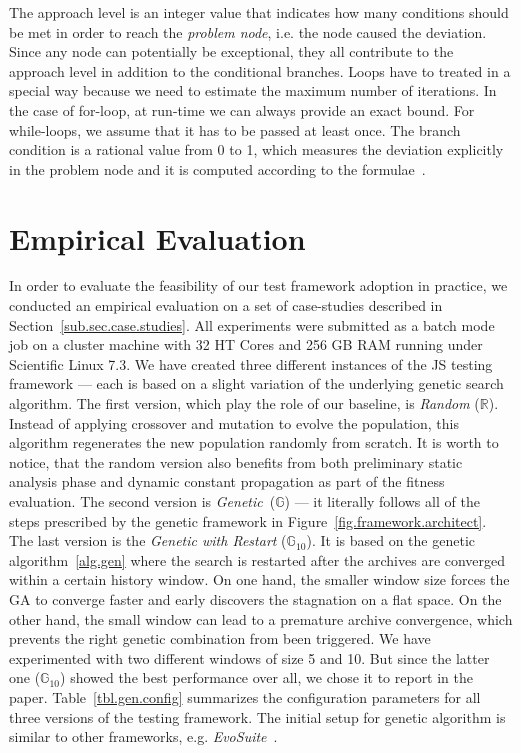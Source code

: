 \documentclass[sigconf,review,anonymous]{acmart}
\newcommand{\Random}{\mathbb{R}}
\newcommand{\Genetic}{\mathbb{G}}
\newcommand{\RGenetic}{\mathbb{G}_{10}}
\begin{document}
The approach level is an integer value that indicates how many conditions should be met in order to reach the \emph{problem node}, i.e. the node caused the deviation. Since any node can potentially be exceptional, they all contribute to the approach level in addition to the conditional branches. Loops have to treated in a special way because we need to estimate the maximum number of iterations. In the case of for-loop, at run-time we can always provide an exact bound. For while-loops, we assume that it has to be passed at least once. The branch condition is a rational value from 0 to 1, which measures the deviation explicitly in the problem node and it is computed according to the formulae~\cite{tracey1998automated}.
 
\section{Empirical Evaluation}
\label{sec.evaluation}

In order to evaluate the feasibility of our test framework adoption in practice, we conducted an empirical evaluation on a set of case-studies described in Section~\ref{sub.sec.case.studies}. All experiments were submitted as a batch mode job on a cluster machine with 32 HT Cores and 256 GB RAM running under Scientific Linux 7.3. We have created three different instances of the JS testing framework --- each is based on a slight variation of the underlying genetic search algorithm. The first version, which play the role of our baseline, is \emph{Random} ($\Random$). Instead of applying crossover and mutation to evolve the population, this algorithm regenerates the new population randomly from scratch. It is worth to notice, that the random version also benefits from both preliminary static analysis phase and dynamic constant propagation as part of the fitness evaluation. The second version is \emph{Genetic}~($\Genetic$) --- it literally follows all of the steps prescribed by the genetic framework in Figure~\ref{fig.framework.architect}. The last version is the \emph{Genetic with Restart} ($\RGenetic$). It is based on the genetic algorithm~\ref{alg.gen} where the search is restarted after the archives are converged within a certain history window. On one hand, the smaller window size forces the GA to converge faster and early discovers the stagnation on a flat space. On the other hand, the small window can lead to a premature archive convergence, which prevents the right genetic combination from been triggered. We have experimented with two different windows of size 5 and 10. But since the latter one ($\RGenetic$) showed the best performance over all, we chose it to report in the paper. Table~\ref{tbl.gen.config} summarizes the configuration parameters for all three versions of the testing framework. The initial setup for genetic algorithm is similar to other frameworks, e.g. \emph{EvoSuite}~\cite{fraser2011evosuite}. 
\end{document}
